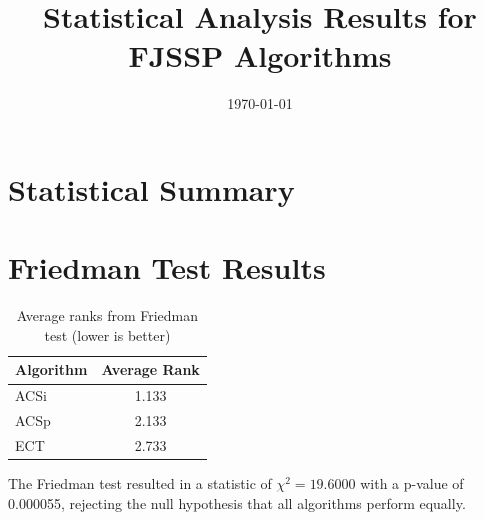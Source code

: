 \documentclass[10pt]{article}
\title{Statistical Analysis Results for FJSSP Algorithms}
\author{}
\date{\today}
\begin{document}
\maketitle

\section*{Statistical Summary}

\section{Friedman Test Results}
\begin{table}[H]
\centering
\caption{Average ranks from Friedman test (lower is better)}
\label{tab:friedman}
\begin{tabular}{lc}
\toprule
Algorithm & Average Rank \\
\midrule
ACSi & 1.133 \\
ACSp & 2.133 \\
ECT & 2.733 \\
\bottomrule
\end{tabular}
\end{table}

The Friedman test resulted in a statistic of $\chi^2 = 19.6000$ with a p-value of 0.000055, rejecting the null hypothesis that all algorithms perform equally.
\end{document}
